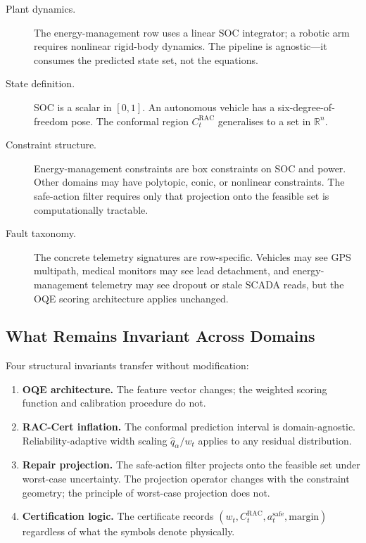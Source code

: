 \begin{description}
  \item[Plant dynamics.] The energy-management row uses a linear SOC integrator;
    a robotic arm requires nonlinear rigid-body dynamics.  The pipeline
    is agnostic---it consumes the predicted state set, not the equations.
  \item[State definition.] SOC is a scalar in $[0,1]$.  An autonomous
    vehicle has a six-degree-of-freedom pose.  The conformal region
    $C_t^{\text{RAC}}$ generalises to a set in $\mathbb{R}^n$.
  \item[Constraint structure.] Energy-management constraints are box constraints
    on SOC and power.  Other domains may have polytopic, conic, or
    nonlinear constraints.  The safe-action filter requires only that
    projection onto the feasible set is computationally tractable.
  \item[Fault taxonomy.] The concrete telemetry signatures are row-specific.
    Vehicles may see GPS multipath, medical monitors may see lead
    detachment, and energy-management telemetry may see dropout or stale
    SCADA reads, but the OQE scoring architecture applies unchanged.
\end{description}

\subsection{What Remains Invariant Across Domains}

Four structural invariants transfer without modification:

\begin{enumerate}
  \item \textbf{OQE architecture.}  The feature vector changes; the
    weighted scoring function and calibration procedure do not.
  \item \textbf{RAC-Cert inflation.}  The conformal prediction interval
    is domain-agnostic.  Reliability-adaptive width scaling
    $\hat{q}_\alpha / w_t$ applies to any residual distribution.
  \item \textbf{Repair projection.}  The safe-action filter projects
    onto the feasible set under worst-case uncertainty.  The projection
    operator changes with the constraint geometry; the principle of
    worst-case projection does not.
  \item \textbf{Certification logic.}  The certificate records
    $(w_t, C_t^{\text{RAC}}, a_t^{\text{safe}}, \text{margin})$
    regardless of what the symbols denote physically.
\end{enumerate}

